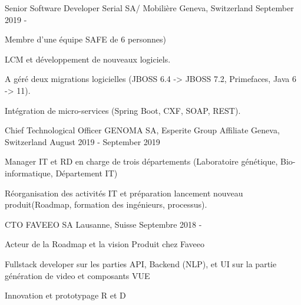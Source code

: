 

\begin{cventries}
\cventry
{Senior Software Developer} %
{Serial SA/ Mobilière} %
{Geneva, Switzerland} %
{September 2019 - } %
{
    \begin{cvitems} %
        \item{Membre d'une équipe SAFE de 6 personnes)}
        \item{LCM et développement de nouveaux logiciels.}
        \item{A géré deux migrations logicielles (JBOSS 6.4 -> JBOSS 7.2, Primefaces, Java 6 -> 11).}
        \item{Intégration de micro-services (Spring Boot, CXF, SOAP, REST).}
    \end{cvitems}
}
\cventry
{Chief Technological Officer} %
{GENOMA SA, Esperite Group Affiliate} %
{Geneva, Switzerland} %
{August 2019 - September 2019 } %
{
    \begin{cvitems} %
        \item{Manager IT et RD en charge de trois départements (Laboratoire génétique, Bio-informatique, Département IT)}
        \item{Réorganisation des activités IT et préparation lancement nouveau produit(Roadmap, formation des ingénieurs, processus).}
    \end{cvitems}
}
\cventry
{CTO} %
{FAVEEO SA} %
{Lausanne, Suisse} %
{Septembre 2018 - } %
{
    \begin{cvitems} %
        \item {Acteur de la Roadmap et la vision Produit chez Faveeo}
        \item {Fullstack developer sur les parties API, Backend (NLP), et UI sur la partie génération de video et composants VUE}
        \item {Innovation et prototypage R et D}        
    \end{cvitems}
}
\end{cventries}
